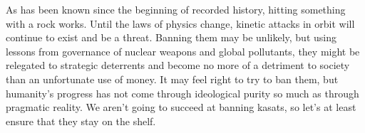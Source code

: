 As has been known since the beginning of recorded history, hitting
something with a rock works.  Until the laws of physics change,
kinetic attacks in orbit will continue to exist and be a threat.
Banning them may be unlikely, but using lessons from governance of
nuclear weapons and global pollutants, they might be relegated to
strategic deterrents and become no more of a detriment to society than
an unfortunate use of money.  It may feel right to try to ban them,
but humanity's progress has not come through ideological purity so
much as through pragmatic reality.  We aren't going to succeed at
banning \aclp{kasat}, so let's at least ensure that they stay on the
shelf.

\label{lastPageOfExecSummary}
